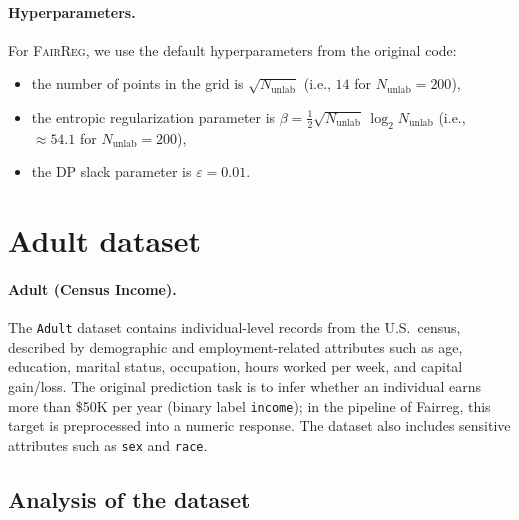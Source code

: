 \documentclass[11pt]{article}
\begin{document}
\paragraph{Hyperparameters.}
For \textsc{FairReg}, we use the default hyperparameters from the original code:
\begin{itemize}
  \item the number of points in the grid is $\sqrt{N_{\text{unlab}}}$ (i.e., $14$ for $N_{\text{unlab}}=200$),
  \item the entropic regularization parameter is $\beta = \tfrac{1}{2}\sqrt{N_{\text{unlab}}}\,\log_2 N_{\text{unlab}}$ (i.e., $\approx 54.1$ for $N_{\text{unlab}}=200$), 
  \item the DP slack parameter is $\varepsilon = 0.01$.
\end{itemize}
\section{Adult dataset}

\paragraph{Adult (Census Income).}
The \texttt{Adult} dataset contains individual-level records from the U.S.\ census, described by demographic and employment-related attributes such as age, education, marital status, occupation, hours worked per week, and capital gain/loss. 
The original prediction task is to infer whether an individual earns more than \$50K per year (binary label \texttt{income}); in the pipeline of Fairreg, this target is preprocessed into a numeric response. 
The dataset also includes sensitive attributes such as \texttt{sex} and \texttt{race}. 
\\


\subsection{Analysis of the dataset}
\end{document}
